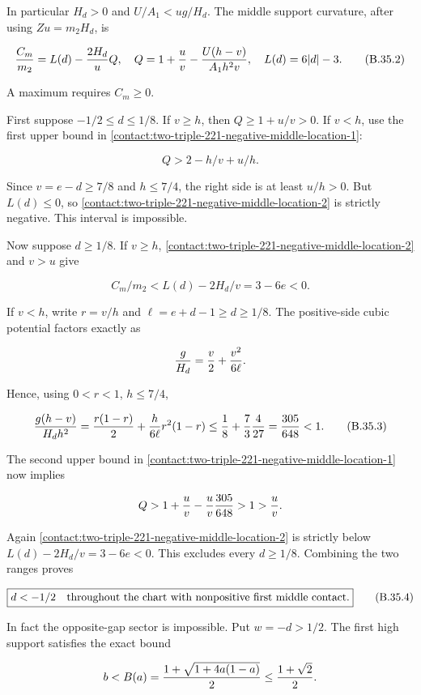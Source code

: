 In particular $H_d>0$ and $U/A_1<u g/H_d$. The middle support
curvature, after using $Z u=m_2 H_d$, is

\[
 {C_m\over m_2}=L(d)-{2H_d\over u}Q,\quad
 Q=1+{u\over v}-{U(h-v)\over A_1h^2v},\quad L(d)=6|d|-3.
\tag{B.35.2}\label{contact:two-triple-221-negative-middle-location-2}
\]

A maximum requires $C_m\ge 0$.

First suppose $-1/2\le d\le 1/8$. If $v\ge h$, then $Q\ge 1+u/v>0$.
If $v<h$, use the first upper bound in \eqref{contact:two-triple-221-negative-middle-location-1}:

\[
 Q>2-h/v+u/h.
\]

Since $v=e-d\ge 7/8$ and $h\le 7/4$, the right side is at least $u/h>0$.
But $L(d)\le 0$, so \eqref{contact:two-triple-221-negative-middle-location-2} is strictly negative. This interval is impossible.

Now suppose $d\ge 1/8$. If $v\ge h$, \eqref{contact:two-triple-221-negative-middle-location-2} and $v>u$ give

\[
 C_m/m_2<L(d)-2H_d/v=3-6e<0.
\]

If $v<h$, write $r=v/h$ and $\ell=e+d-1\ge d\ge 1/8$.
The positive-side cubic potential factors exactly as

\[
 {g\over H_d}={v\over2}+{v^2\over6\ell}.
\]

Hence, using $0<r<1$, $h\le 7/4$,

\[
 {g(h-v)\over H_dh^2}
 ={r(1-r)\over2}+{h\over6\ell}r^2(1-r)
 \le {1\over8}+{7\over3}{4\over27}
 ={305\over648}<1.
\tag{B.35.3}\label{contact:two-triple-221-negative-middle-location-3}
\]

The second upper bound in \eqref{contact:two-triple-221-negative-middle-location-1} now implies

\[
 Q>1+{u\over v}-{u\over v}{305\over648}>1>{u\over v}.
\]

Again \eqref{contact:two-triple-221-negative-middle-location-2} is strictly below $L(d)-2H_d/v=3-6e<0$.
This excludes every $d\ge 1/8$. Combining the two ranges proves

\[
 \boxed{d<-1/2\quad\hbox{throughout the chart with nonpositive first middle contact}.}
\tag{B.35.4}\label{contact:two-triple-221-negative-middle-location-4}
\]

In fact the opposite-gap sector is impossible. Put $w=-d>1/2$.
The first high support satisfies the exact bound

\[
 b<B(a)={1+\sqrt{1+4a(1-a)}\over2}
 \le {1+\sqrt2\over2}.
\]

